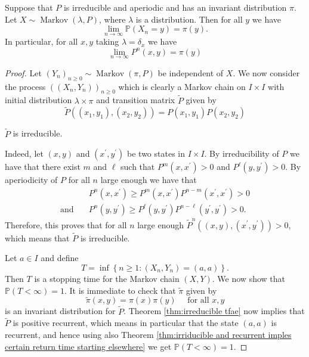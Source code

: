 \documentclass[a4paper,11pt]{article}
\begin{document}
\begin{theorem}\label{thm:Convergence to equilibrium}
    Suppose that $P$ is irreducible and aperiodic and has an invariant distribution $\pi$. Let $X \sim \operatorname{Markov}(\lambda, P)$, where $\lambda$ is a distribution. Then for all $y$ we have
    \[
    \lim _{n \rightarrow \infty} \mathbb{P}\left(X_n=y\right)=\pi(y) .
    \]
    In particular, for all $x, y$ taking $\lambda=\delta_x$ we have
    \[
    \lim _{n \rightarrow \infty} P^n(x, y)=\pi(y)
    \]
\end{theorem}
\begin{proof}
    Let $\left(Y_n\right)_{n \geq 0} \sim \operatorname{Markov}(\pi, P)$ be independent of $X$. We now consider the process $\left(\left(X_n, Y_n\right)\right)_{n \geq 0}$ which is clearly a Markov chain on $I \times I$ with initial distribution $\lambda \times \pi$ and transition matrix $\widetilde{P}$ given by
    \[
    \widetilde{P}\left(\left(x_1, y_1\right),\left(x_2,y_2\right)\right)=P\left(x_1, y_1\right) P\left(x_2, y_2\right)
    \]
    \begin{claim}
        $ \widetilde{P} $ is irreducible. 
    \end{claim}
    Indeed, let $(x, y)$ and $\left(x^{\prime}, y^{\prime}\right)$ be two states in $I \times I$. By irreducibility of $P$ we have that there exist $m$ and $\ell$ such that $P^m\left(x, x^{\prime}\right)>0$ and $P^{\ell}\left(y, y^{\prime}\right)>0$. By aperiodicity of $P$ for all $n$ large enough we have that
    \begin{align*}
        &P^n\left(x, x^{\prime}\right) \geq P^m\left(x, x^{\prime}\right) P^{n-m}\left(x^{\prime}, x^{\prime}\right)>0\\ \text {and}\quad & P^n\left(y, y^{\prime}\right) \geq P^{\ell}\left(y, y^{\prime}\right) P^{n-\ell}\left(y^{\prime}, y^{\prime}\right)>0 .
    \end{align*}
    Therefore, this proves that for all $n$ large enough $\widetilde{P}^n\left((x, y),\left(x^{\prime}, y^{\prime}\right)\right)>0$, which means that $\widetilde{P}$ is irreducible.

    Let $a \in I$ and define
    \[
    T=\inf \left\{n \geq 1:\left(X_n, Y_n\right)=(a, a)\right\} .
    \]
    Then $T$ is a stopping time for the Markov chain $(X, Y)$. We now show that $\mathbb{P}(T<\infty)=1$. It is immediate to check that $\widetilde{\pi}$ given by
    \[
    \widetilde{\pi}(x, y)=\pi(x) \pi(y) \quad \text { for all } x, y
    \]
    is an invariant distribution for $\widetilde{P}$. Theorem \ref{thm:irreducible tfae} now implies that $\widetilde{P}$ is positive recurrent, which means in particular that the state $(a, a)$ is recurrent, and hence using also Theorem \ref{thm:irriducible and recurrent imples certain return time starting elsewhere} we get $\mathbb{P}(T<\infty)=1$.


\end{proof}
\end{document}
